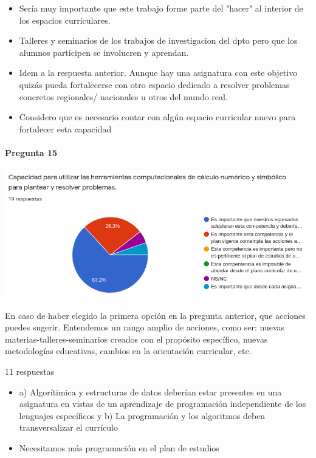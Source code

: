 \documentclass[a4paper,10pt,BCOR10mm,oneside,headsepline]{scrbook}
\begin{document}
\begin{subappendices}
\begin{itemize}
\item Sería muy importante que este trabajo forme parte del "hacer" al interior de los espacios curriculares.

\item Talleres y seminarios de los trabajos de investigacion del dpto pero que los alumnos participen se involucren y aprendan.

\item Idem a la respuesta anterior. Aunque hay una asignatura con este objetivo quizás pueda fortalecerse con otro espacio dedicado a resolver problemas concretos regionales/ nacionales u otros del mundo real. 

\item Considero que es necesario contar con algún espacio curricular nuevo para fortalecer esta capacidad  


 
 \end{itemize}
   \paragraph{Pregunta 15}
\begin{center}
 
\includegraphics[scale=.9]{doc15.png}
 \end{center}
 

 En caso de haber elegido la primera opción en la pregunta anterior, que acciones puedes sugerir. Entendemos un rango amplio de acciones, como ser: nuevas materias-talleres-seminarios creados con el propósito específico, nuevas metodologías educativas, cambios en la orientación curricular, etc. 
 
 11 respuestas

 \begin{itemize}
  \item a) Algorítimica y estructuras de datos deberían estar presentes en una asignatura en vistas de un aprendizaje de programación independiente de los lenguajes específicos y b) La programación y los algoritmos deben transversalizar el currículo
\item Necesitamos más programación en el plan de estudios


\end{itemize}
\end{subappendices}
\end{document}
